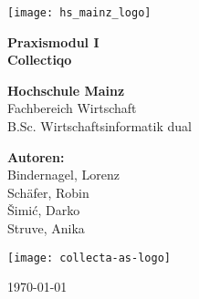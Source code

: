\begin{titlepage}
    \centering
    \vspace*{1cm}

    \texttt{[image: hs\_mainz\_logo]}\\
    \vspace{1.5cm}

    \textbf{\LARGE Praxismodul I}\\
    \vspace{0.5cm}
    \textbf{\Large Collectiqo}\\
    \vspace{1.5cm}

    \textbf{Hochschule Mainz}\\
    \vspace{0.5cm}
    Fachbereich Wirtschaft\\
    \vspace{0.5cm}
    B.Sc. Wirtschaftsinformatik dual\\
    \vspace{1.5cm}

    \textbf{Autoren:}\\
    Bindernagel, Lorenz\\
    Schäfer, Robin\\
    Šimić, Darko\\
    Struve, Anika\\

    \vspace{1.5cm}
    
    \texttt{[image: collecta-as-logo]}\\
    \vfill

    \today
\end{titlepage}